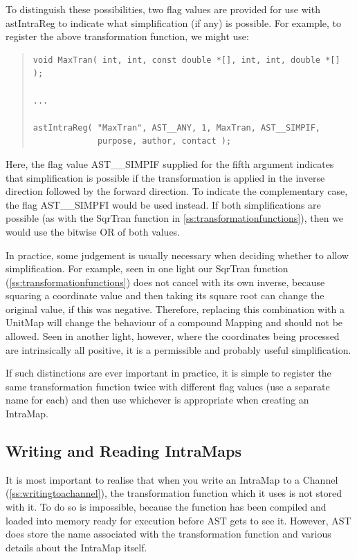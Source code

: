 \documentclass[twoside,11pt]{article}
\newcommand{\htmlref}[2]{#1}
\newcommand{\secref}[1]{\S\ref{#1}}
\renewcommand{\secref}[1]{\ref{#1}}
\begin{document}
To distinguish these possibilities, two flag values are provided for
use with \htmlref{astIntraReg}{astIntraReg} to indicate what simplification (if any) is
possible. For example, to register the above transformation function,
we might use:

\begin{quote}
\small
\begin{verbatim}
void MaxTran( int, int, const double *[], int, int, double *[] );

...

astIntraReg( "MaxTran", AST__ANY, 1, MaxTran, AST__SIMPIF,
             purpose, author, contact );
\end{verbatim}
\normalsize
\end{quote}

Here, the flag value AST\_\_SIMPIF supplied for the fifth argument
indicates that simplification is possible if the transformation is
applied in the inverse direction followed by the forward direction. To
indicate the complementary case, the flag AST\_\_SIMPFI would be used
instead. If both simplifications are possible (as with the SqrTran
function in \secref{ss:transformationfunctions}), then we would use
the bitwise OR of both values.

In practice, some judgement is usually necessary when deciding whether
to allow simplification. For example, seen in one light our SqrTran
function (\secref{ss:transformationfunctions}) does not cancel with
its own inverse, because squaring a coordinate value and then taking
its square root can change the original value, if this was
negative. Therefore, replacing this combination with a UnitMap will
change the behaviour of a compound Mapping and should not be
allowed. Seen in another light, however, where the coordinates being
processed are intrinsically all positive, it is a permissible and
probably useful simplification.

If such distinctions are ever important in practice, it is simple to
register the same transformation function twice with different flag
values (use a separate name for each) and then use whichever is
appropriate when creating an \htmlref{IntraMap}{IntraMap}.

\subsection{\label{ss:readingandwritingintramaps}Writing and Reading IntraMaps}

It is most important to realise that when you write an \htmlref{IntraMap}{IntraMap} to a
\htmlref{Channel}{Channel} (\secref{ss:writingtoachannel}), the transformation function
which it uses is not stored with it. To do so is impossible, because
the function has been compiled and loaded into memory ready for
execution before AST gets to see it. However, AST does store the name
associated with the transformation function and various details about
the IntraMap itself.
\end{document}
